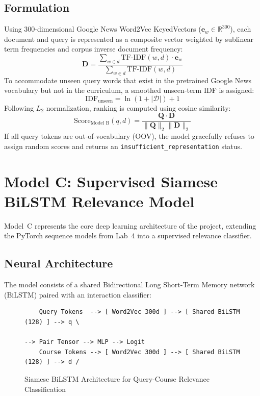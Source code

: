 \documentclass[12pt,a4paper]{report}
\begin{document}
\subsection{Formulation}
Using 300-dimensional Google News Word2Vec KeyedVectors ($\mathbf{e}_w \in \mathbb{R}^{300}$), each document and query is represented as a composite vector weighted by sublinear term frequencies and corpus inverse document frequency:
\begin{equation}
    \mathbf{D} = \frac{\sum_{w \in d} \text{TF-IDF}(w, d) \cdot \mathbf{e}_w}{\sum_{w \in d} \text{TF-IDF}(w, d)}
\end{equation}
To accommodate unseen query words that exist in the pretrained Google News vocabulary but not in the curriculum, a smoothed unseen-term IDF is assigned:
\begin{equation}
    \text{IDF}_{\text{unseen}} = \ln(1 + |\mathcal{D}|) + 1
\end{equation}
Following $L_2$ normalization, ranking is computed using cosine similarity:
\begin{equation}
    \text{Score}_{\text{Model B}}(q, d) = \frac{\mathbf{Q} \cdot \mathbf{D}}{\|\mathbf{Q}\|_2 \|\mathbf{D}\|_2}
\end{equation}
If all query tokens are out-of-vocabulary (OOV), the model gracefully refuses to assign random scores and returns an \texttt{insufficient\_representation} status.

\section{Model C: Supervised Siamese BiLSTM Relevance Model}
Model~C represents the core deep learning architecture of the project, extending the PyTorch sequence models from Lab~4 into a supervised relevance classifier.

\subsection{Neural Architecture}
The model consists of a shared Bidirectional Long Short-Term Memory network (BiLSTM) paired with an interaction classifier:
\begin{figure}[H]
    \centering
    \begin{verbatim}
    Query Tokens  --> [ Word2Vec 300d ] --> [ Shared BiLSTM (128) ] --> q \
                                                                            --> Pair Tensor --> MLP --> Logit
    Course Tokens --> [ Word2Vec 300d ] --> [ Shared BiLSTM (128) ] --> d /
    \end{verbatim}
    \caption{Siamese BiLSTM Architecture for Query-Course Relevance Classification}
    \label{fig:bilstm_arch}
\end{figure}
\end{document}
